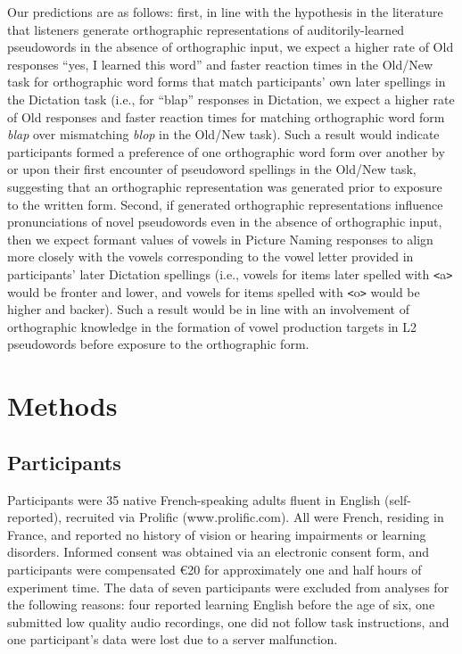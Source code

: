 \documentclass[
  english,
  man,floatsintext]{apa7}
\begin{document}
Our predictions are as follows: first, in line with the hypothesis in the literature that listeners generate orthographic representations of auditorily-learned pseudowords in the absence of orthographic input, we expect a higher rate of Old responses ``yes, I learned this word'' and faster reaction times in the Old/New task for orthographic word forms that match participants' own later spellings in the Dictation task (i.e., for ``blap'' responses in Dictation, we expect a higher rate of Old responses and faster reaction times for matching orthographic word form \emph{blap} over mismatching \emph{blop} in the Old/New task). Such a result would indicate participants formed a preference of one orthographic word form over another by or upon their first encounter of pseudoword spellings in the Old/New task, suggesting that an orthographic representation was generated prior to exposure to the written form. Second, if generated orthographic representations influence pronunciations of novel pseudowords even in the absence of orthographic input, then we expect formant values of vowels in Picture Naming responses to align more closely with the vowels corresponding to the vowel letter provided in participants' later Dictation spellings (i.e., vowels for items later spelled with \texttt{\textless{}}a\texttt{\textgreater{}} would be fronter and lower, and vowels for items spelled with \texttt{\textless{}}o\texttt{\textgreater{}} would be higher and backer). Such a result would be in line with an involvement of orthographic knowledge in the formation of vowel production targets in L2 pseudowords before exposure to the orthographic form.

\section{Methods}\label{methods}

\subsection{Participants}\label{participants}

Participants were 35 native French-speaking adults fluent in English (self-reported), recruited via Prolific (www.prolific.com). All were French, residing in France, and reported no history of vision or hearing impairments or learning disorders. Informed consent was obtained via an electronic consent form, and participants were compensated €20 for approximately one and half hours of experiment time. The data of seven participants were excluded from analyses for the following reasons: four reported learning English before the age of six, one submitted low quality audio recordings, one did not follow task instructions, and one participant's data were lost due to a server malfunction.
\end{document}
